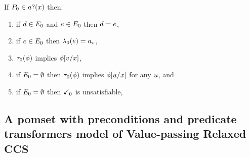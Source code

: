 \begin{definition}
  If $\aPS_0 \in \sRECV\aChan{\aVar}$ then:
  \begin{enumerate}
  \item if $d\in E_0$ and $e\in E_0$ then $d=e$,
  \item if $e\in E_0$ then $\lambda_0(e) = {a}_{v}$,
  \item $\tau_0(\phi)$ implies $\phi[v/x]$,
  \item if $E_0=\emptyset$ then $\tau_0(\phi)$ implies $\phi[u/x]$ for any $u$, and
  \item if $E_0=\emptyset$ then $\checkmark_0$ is unsatisfiable,
  \end{enumerate}
\end{definition}

\subsection{A pomset with preconditions and predicate transformers model of Value-passing Relaxed CCS}

